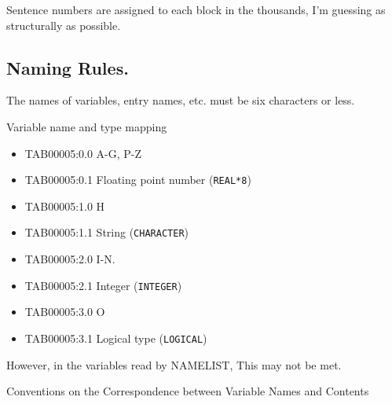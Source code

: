 Sentence numbers are assigned to each block in the thousands, I'm
guessing as structurally as possible.

\hypertarget{naming-rules.}{%
\subsection{Naming Rules.}\label{naming-rules.}}

The names of variables, entry names, etc. must be six characters or
less.

Variable name and type mapping

\begin{itemize}
\item
  TAB00005:0.0 A-G, P-Z
\item
  TAB00005:0.1 Floating point number ({\texttt{REAL*8}})
\item
  TAB00005:1.0 H
\item
  TAB00005:1.1 String ({\texttt{CHARACTER}})
\item
  TAB00005:2.0 I-N.
\item
  TAB00005:2.1 Integer ({\texttt{INTEGER}})
\item
  TAB00005:3.0 O
\item
  TAB00005:3.1 Logical type ({\texttt{LOGICAL}})
\end{itemize}

However, in the variables read by NAMELIST, This may not be met.

Conventions on the Correspondence between Variable Names and Contents

